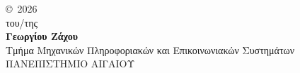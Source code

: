 \newpage
\thispagestyle{empty}
\vspace*{\fill}
\begin{center}
\copyright\ 2026\\
του/της\\
\textbf{Γεωργίου Ζάχου}\\[0.5cm]
Τμήμα Μηχανικών Πληροφοριακών και Επικοινωνιακών Συστημάτων\\
ΠΑΝΕΠΙΣΤΗΜΙΟ ΑΙΓΑΙΟΥ
\end{center}
\vspace*{\fill}
